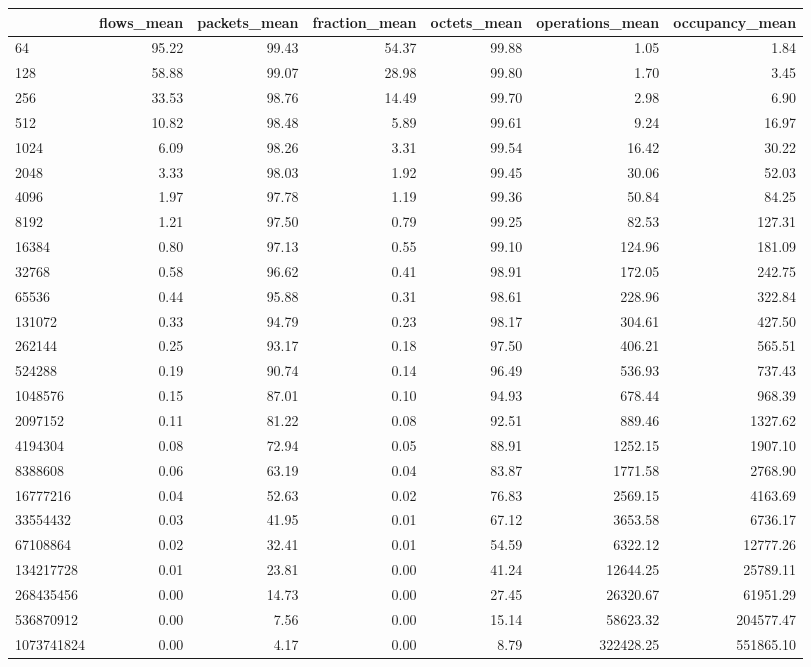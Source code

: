 \begin{tabular}{lrrrrrr}
\toprule
 & flows_mean & packets_mean & fraction_mean & octets_mean & operations_mean & occupancy_mean \\
\midrule
64 & 95.22 & 99.43 & 54.37 & 99.88 & 1.05 & 1.84 \\
128 & 58.88 & 99.07 & 28.98 & 99.80 & 1.70 & 3.45 \\
256 & 33.53 & 98.76 & 14.49 & 99.70 & 2.98 & 6.90 \\
512 & 10.82 & 98.48 & 5.89 & 99.61 & 9.24 & 16.97 \\
1024 & 6.09 & 98.26 & 3.31 & 99.54 & 16.42 & 30.22 \\
2048 & 3.33 & 98.03 & 1.92 & 99.45 & 30.06 & 52.03 \\
4096 & 1.97 & 97.78 & 1.19 & 99.36 & 50.84 & 84.25 \\
8192 & 1.21 & 97.50 & 0.79 & 99.25 & 82.53 & 127.31 \\
16384 & 0.80 & 97.13 & 0.55 & 99.10 & 124.96 & 181.09 \\
32768 & 0.58 & 96.62 & 0.41 & 98.91 & 172.05 & 242.75 \\
65536 & 0.44 & 95.88 & 0.31 & 98.61 & 228.96 & 322.84 \\
131072 & 0.33 & 94.79 & 0.23 & 98.17 & 304.61 & 427.50 \\
262144 & 0.25 & 93.17 & 0.18 & 97.50 & 406.21 & 565.51 \\
524288 & 0.19 & 90.74 & 0.14 & 96.49 & 536.93 & 737.43 \\
1048576 & 0.15 & 87.01 & 0.10 & 94.93 & 678.44 & 968.39 \\
2097152 & 0.11 & 81.22 & 0.08 & 92.51 & 889.46 & 1327.62 \\
4194304 & 0.08 & 72.94 & 0.05 & 88.91 & 1252.15 & 1907.10 \\
8388608 & 0.06 & 63.19 & 0.04 & 83.87 & 1771.58 & 2768.90 \\
16777216 & 0.04 & 52.63 & 0.02 & 76.83 & 2569.15 & 4163.69 \\
33554432 & 0.03 & 41.95 & 0.01 & 67.12 & 3653.58 & 6736.17 \\
67108864 & 0.02 & 32.41 & 0.01 & 54.59 & 6322.12 & 12777.26 \\
134217728 & 0.01 & 23.81 & 0.00 & 41.24 & 12644.25 & 25789.11 \\
268435456 & 0.00 & 14.73 & 0.00 & 27.45 & 26320.67 & 61951.29 \\
536870912 & 0.00 & 7.56 & 0.00 & 15.14 & 58623.32 & 204577.47 \\
1073741824 & 0.00 & 4.17 & 0.00 & 8.79 & 322428.25 & 551865.10 \\
\bottomrule
\end{tabular}

